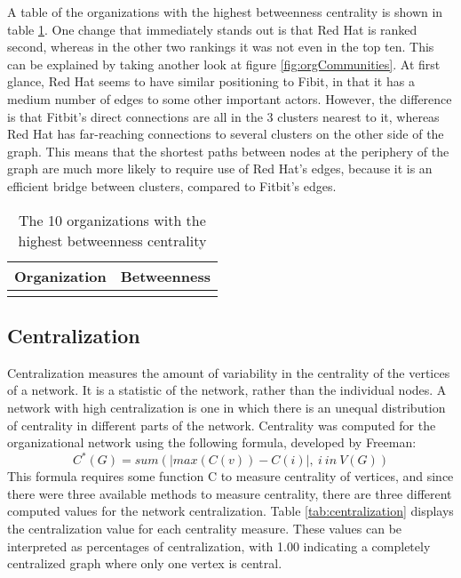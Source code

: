 A table of the organizations with the highest betweenness centrality is shown in table \ref{tab:betweenness}. One change that immediately stands out is that Red Hat is ranked second, whereas in the other two rankings it was not even in the top ten. This can be explained by taking another look at figure \ref{fig:orgCommunities}. At first glance, Red Hat seems to have similar positioning to Fibit, in that it has a medium number of edges to some other important actors. However, the difference is that Fitbit's direct connections are all in the 3 clusters nearest to it, whereas Red Hat has far-reaching connections to several clusters on the other side of the graph. This means that the shortest paths between nodes at the periphery of the graph are much more likely to require use of Red Hat's edges, because it is an efficient bridge between clusters, compared to Fitbit's edges.

\begin{table}
	\begin{tabular}{l|c}%
		\bfseries Organization & \bfseries Betweenness%
		\csvreader[head to column names]{betweenness.csv}{}%
		{\\\hline\organizationc & \scorec}%
	\end{tabular}
	\centering
	\caption{The 10 organizations with the highest betweenness centrality}\label{tab:betweenness}
\end{table}

\subsection{Centralization}
Centralization measures the amount of variability in the centrality of the vertices of a network. It is a statistic of the network, rather than the individual nodes. A network with high centralization is one in which there is an unequal distribution of centrality in different parts of the network.  Centrality was computed for the organizational network using the following formula, developed by Freeman\cite{freeman1978centrality}:
\begin{equation*}
C^*(G) = sum( |max(C(v))-C(i)|,\:i\:in\:V(G) )
\end{equation*}
This formula requires some function C to measure centrality of vertices, and since there were three available methods to measure centrality, there are three different computed values for the network centralization. Table \ref{tab:centralization} displays the centralization value for each centrality measure. These values can be interpreted as percentages of centralization, with 1.00 indicating a completely centralized graph where only one vertex is central.

